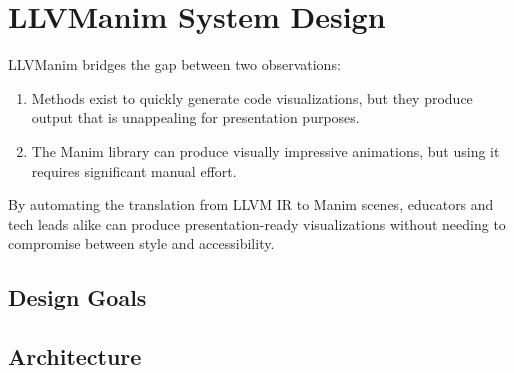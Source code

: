 \section{LLVManim System Design}
LLVManim bridges the gap between two observations:
\begin{enumerate}
    \item Methods exist to quickly generate code visualizations, but they produce
    output that is unappealing for presentation purposes.
    \item The Manim library can produce visually impressive animations, but using
    it requires significant manual effort.
\end{enumerate}
By automating the translation from LLVM IR to Manim scenes, educators
and tech leads alike can produce presentation-ready visualizations
without needing to compromise between style and accessibility.

\subsection{Design Goals}


\subsection{Architecture}

